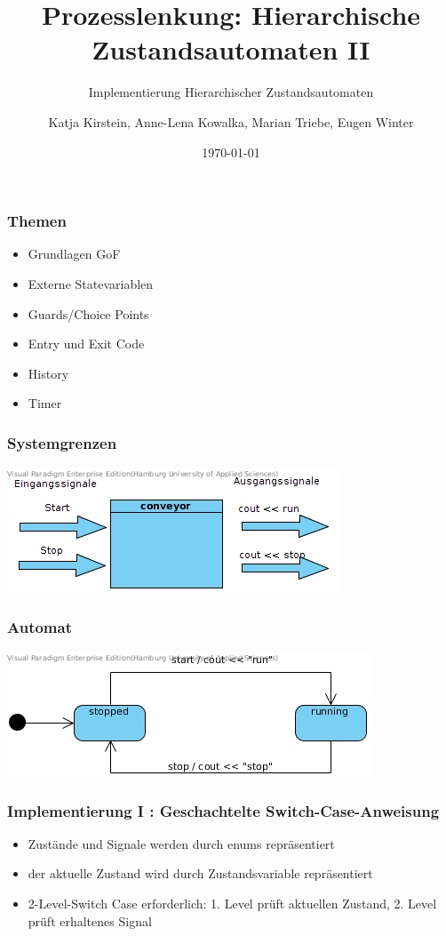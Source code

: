 \documentclass{beamer}
\title{Prozesslenkung: Hierarchische Zustandsautomaten II}
\subtitle{Implementierung Hierarchischer Zustandsautomaten}
\author{Katja Kirstein, Anne-Lena Kowalka, Marian Triebe, Eugen Winter}
\date{\today}
\begin{document}
\begin{frame}
 \titlepage
\end{frame}

\begin{frame}
 \frametitle{Themen}
 \begin{itemize}
  \item Grundlagen GoF
  \item Externe Statevariablen
  \item Guards/Choice Points
  \item Entry und Exit Code
  \item History
  \item Timer
 \end{itemize}
\end{frame}

\begin{frame}
 \frametitle{Systemgrenzen}
 \includegraphics[scale=.7]{img/Systemgrenzen_fsm_gof.jpg}
\end{frame}

\begin{frame}
 \frametitle{Automat}
 \includegraphics[scale=.8]{img/fsm_gof_automat.jpg}
\end{frame}

\begin{frame}
	\frametitle{Implementierung I : Geschachtelte Switch-Case-Anweisung}
	\begin{itemize}
		\item Zust\"ande und Signale werden durch enums repr\"asentiert
		\item der aktuelle Zustand wird durch Zustandsvariable repr\"asentiert
		\item 2-Level-Switch Case erforderlich: 1. Level pr\"uft aktuellen Zustand,
		2. Level pr\"uft erhaltenes Signal
	\end{itemize}
\end{frame}
\end{document}
